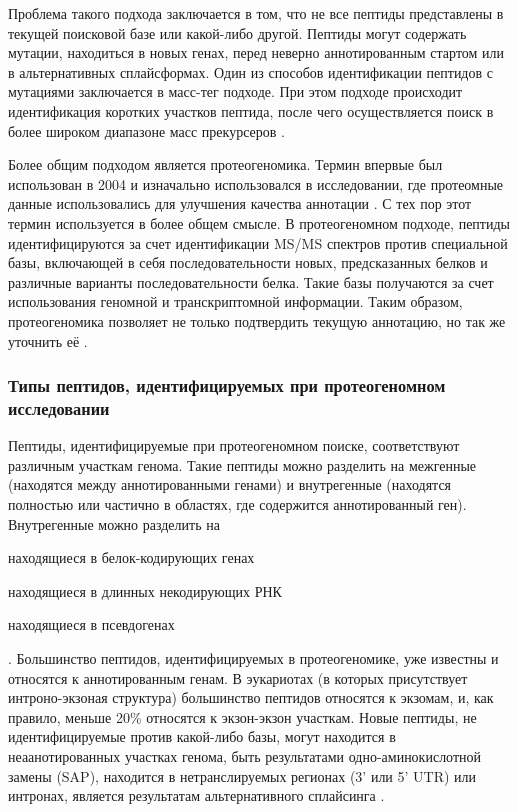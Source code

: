 Проблема такого подхода заключается в том, что не все пептиды представлены в текущей поисковой базе или какой-либо другой. Пептиды могут содержать мутации, находиться в новых генах, перед неверно аннотированным стартом или в альтернативных сплайсформах. 
Один из способов идентификации пептидов с мутациями заключается в масс-тег подходе. При этом подходе происходит идентификация коротких участков пептида, после чего осуществляется поиск в более широком диапазоне масс прекурсеров \cite{dasari2010tagrecon}. 

Более общим подходом является протеогеномика. Термин впервые был использован в 2004 и изначально использовался в исследовании, где протеомные данные использовались для улучшения качества аннотации \cite{jaffe2004proteogenomic}. С тех пор этот термин используется в более общем смысле. В протеогеномном подходе, пептиды идентифицируются за счет идентификации MS/MS спектров против специальной базы, включающей в себя последовательности новых, предсказанных белков и различные варианты последовательности белка. Такие базы получаются за счет использования геномной и транскриптомной информации. Таким образом, протеогеномика позволяет не только подтвердить текущую аннотацию, но так же уточнить её \cite{nesvizhskii2014proteogenomics}. 

\subsubsection{Типы пептидов, идентифицируемых при протеогеномном исследовании}
Пептиды, идентифицируемые при протеогеномном поиске, соответствуют различным участкам генома. Такие пептиды можно разделить на межгенные (находятся между аннотированными генами) и внутрегенные (находятся полностью или частично в областях, где содержится аннотированный ген). Внутрегенные можно разделить на 
\begin{inparaenum}
    \item находящиеся в белок-кодирующих генах 
    \item находящиеся в длинных некодирующих РНК
    \item находящиеся в псевдогенах
\end{inparaenum} \cite{harrow2012gencode}. Большинство пептидов, идентифицируемых в протеогеномике, уже известны и относятся к аннотированным генам. В эукариотах (в которых присутствует интроно-экзоная структура) большинство пептидов относятся к экзомам, и, как правило, меньше 20\% относятся к экзон-экзон участкам. Новые пептиды, не идентифицируемые против какой-либо базы, могут находится в неаанотированных участках генома, быть результатами одно-аминокислотной замены (SAP), находится в нетранслируемых регионах (3' или 5' UTR) или интронах, является результатам альтернативного сплайсинга \cite{nesvizhskii2014proteogenomics}.

